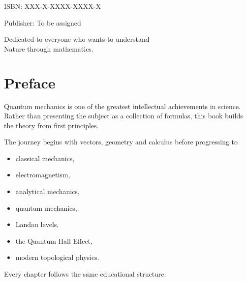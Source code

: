 \documentclass[11pt,a4paper,openany]{book}
\begin{document}
\vfill

ISBN: XXX-X-XXXX-XXXX-X

Publisher: To be assigned


\cleardoublepage

\thispagestyle{empty}

\vspace*{\fill}

\begin{center}
	\itshape
	
	Dedicated to everyone who wants to understand\\
	Nature through mathematics.
	
\end{center}

\vspace*{\fill}


\chapter*{Preface}

Quantum mechanics is one of the greatest intellectual achievements in science.
Rather than presenting the subject as a collection of formulas, this book
builds the theory from first principles.

The journey begins with vectors, geometry and calculus before progressing to

\begin{itemize}
	\item classical mechanics,
	\item electromagnetism,
	\item analytical mechanics,
	\item quantum mechanics,
	\item Landau levels,
	\item the Quantum Hall Effect,
	\item modern topological physics.
\end{itemize}

Every chapter follows the same educational structure:
\end{document}
